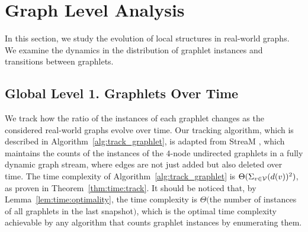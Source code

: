 \section{Graph Level Analysis}\label{section:graph}

In this section, we study the evolution of local structures in real-world graphs.
We examine the dynamics in the distribution of graphlet instances and transitions between graphlets.

\subsection{Global Level 1. Graphlets Over Time}
\label{section:graph:time}
We track how the ratio of the instances of each graphlet changes as the considered real-world graphs evolve over time. Our tracking algorithm, which is described in Algorithm~\ref{alg:track_graphlet}, is adapted from StreaM \cite{schiller2015stream}, which maintains the counts of the instances of the $4$-node undirected graphlets in a fully dynamic graph stream, where edges are not just added but also deleted over time. The time complexity of Algorithm~\ref{alg:track_graphlet} is $\Theta(\Sigma_{v\in\mathcal{V}}(d(v))^2)$, as proven in Theorem~\ref{thm:time:track}.
It should be noticed that, by Lemma~\ref{lem:time:optimality}, the time complexity is $\Theta($the number of instances of all graphlets in the last snapshot$)$, which is the optimal time complexity achievable by any algorithm that counts graphlet instances by enumerating them.

